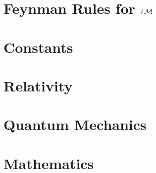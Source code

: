 \documentclass[landscape,8pt,a4paper,english]{extarticle}
\begin{document}
\begin{multicols*}{3}
        \section*{Feynman Rules for $i\operatorname{\mathcal{M}}$}
        \section*{Constants}
        \section*{Relativity}
        \section*{Quantum Mechanics}
        \section*{Mathematics}
\end{multicols*}
\end{document}
